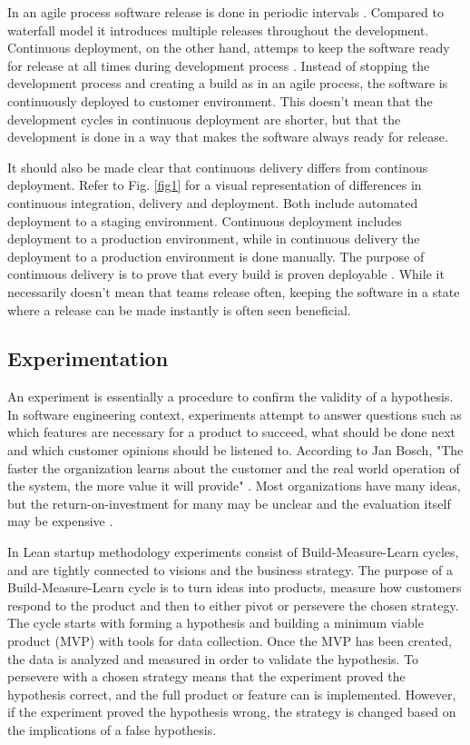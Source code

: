 \documentclass[english]{tktltiki2}
\theoremstyle{definition}
\theoremstyle{remark}
\begin{document}
In an agile process software release is done in periodic intervals \cite{cockburn2002agile}. Compared to waterfall model it introduces multiple releases throughout the development. Continuous deployment, on the other hand, attemps to keep the software ready for release at all times during development process \cite{cdbook}. Instead of stopping the development process and creating a build as in an agile process, the software is continuously deployed to customer environment. This doesn't mean that the development cycles in continuous deployment are shorter, but that the development is done in a way that makes the software always ready for release.

It should also be made clear that continuous delivery differs from continous deployment. Refer to Fig. \ref{fig1} for a visual representation of differences in continuous integration, delivery and deployment. Both include automated deployment to a staging environment. Continuous deployment includes deployment to a production environment, while in continuous delivery the deployment to a production environment is done manually. The purpose of continuous delivery is to prove that every build is proven deployable \cite{cdbook}. While it necessarily doesn't mean that teams release often, keeping the software in a state where a release can be made instantly is often seen beneficial.

\subsection{Experimentation}
An experiment is essentially a procedure to confirm the validity of a hypothesis. In software engineering context, experiments attempt to answer questions such as which features are necessary for a product to succeed, what should be done next and which customer opinions should be listened to. According to Jan Bosch, "The faster the organization learns about the customer and the real world operation of the system, the more value it will provide" \cite{bosch2012building}. Most organizations have many ideas, but the return-on-investment for many may be unclear and the evaluation itself may be expensive \cite{kohavi2007practical}. 

In Lean startup methodology \cite{ries2011lean} experiments consist of Build-Measure-Learn cycles, and are tightly connected to visions and the business strategy. The purpose of a Build-Measure-Learn cycle is to turn ideas into products, measure how customers respond to the product and then to either pivot or persevere the chosen strategy. The cycle starts with forming a hypothesis and building a minimum viable product (MVP) with tools for data collection. Once the MVP has been created, the data is analyzed and measured in order to validate the hypothesis. To persevere with a chosen strategy means that the experiment proved the hypothesis correct, and the full product or feature can is implemented. However, if the experiment proved the hypothesis wrong, the strategy is changed based on the implications of a false hypothesis.
\end{document}
